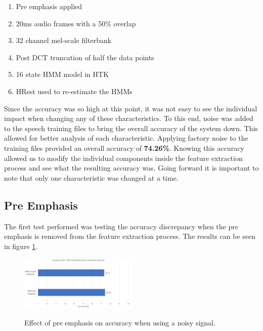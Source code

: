 \documentclass[journal]{IEEEtran}
\begin{document}
	\begin{enumerate}
		\item Pre emphasis applied
		\item 20ms audio frames with a 50\% overlap
		\item 32 channel mel-scale filterbank
		\item Post DCT truncation of half the data points
		\item 16 state HMM model in HTK
		\item HRest used to re-estimate the HMMs
	\end{enumerate}

	Since the accuracy was so high at this point, it was not easy to see the individual impact when changing any of these characteristics. To this end, noise was added to the speech training files to bring the overall accuracy of the system down. This allowed for better analysis of each characteristic. Applying factory noise to the training files provided an overall accuracy of \textbf{74.26\%}. Knowing this accuracy allowed us to modify the individual components inside the feature extraction process and see what the resulting accuracy was. Going forward it is important to note that only one characteristic was changed at a time.
	
	\subsection{Pre Emphasis}
	The first test performed was testing the accuracy discrepancy when the pre emphasis is removed from the feature extraction process. The results can be seen in figure \ref{fig:eval_pre}.
	\\
	\begin{figure}[!htb]
		\centering
		\captionsetup{justification=centering}
		\includegraphics[width=0.5\textwidth]{eval_pre.jpg}\\
		\caption{Effect of pre emphasis on accuracy when using a noisy signal. }\label{fig:eval_pre}
	\end{figure}
	
\end{document}
